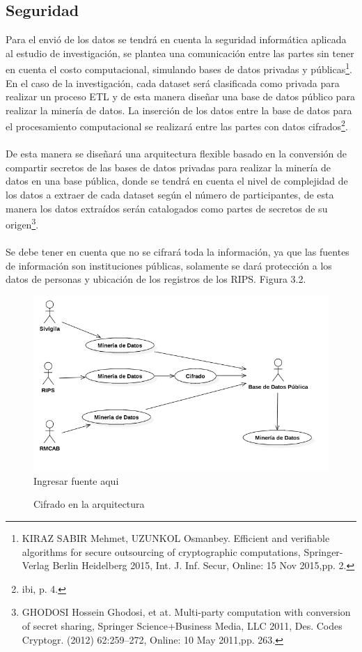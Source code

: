 \documentclass[a4paper,openright,12pt]{book}
\theoremstyle{definition}
\theoremstyle{remark}
\begin{document}
	\subsection{Seguridad}
Para el envió de los datos se tendrá en cuenta la seguridad informática aplicada al estudio de investigación, se plantea una comunicación entre las partes sin tener en cuenta el costo computacional, simulando bases de datos privadas y públicas\footnote{KIRAZ SABIR Mehmet, UZUNKOL Osmanbey. Efficient and verifiable algorithms for secure outsourcing of cryptographic computations, Springer-Verlag Berlin Heidelberg 2015, Int. J. Inf. Secur, Online: 15 Nov 2015,pp. 2.}. En el caso de la investigación, cada dataset será clasificada como privada para realizar un proceso ETL y de esta manera diseñar una base de datos público para realizar la minería de datos. La inserción de los datos entre la base de datos para el procesamiento computacional se realizará entre las partes con datos cifrados\footnote{ibi, p.  4.}.\\\\
De esta manera se diseñará una arquitectura flexible basado en la conversión de compartir secretos de las bases de datos privadas para realizar la minería de datos en una base pública, donde se tendrá en cuenta el nivel de complejidad de los datos a extraer de cada dataset según el número de participantes, de esta manera los datos extraídos serán catalogados como partes de secretos de su origen\footnote{GHODOSI Hossein Ghodosi, et at. Multi-party computation with conversion of secret sharing, Springer Science+Business Media, LLC 2011, Des. Codes Cryptogr. (2012) 62:259–272, Online: 10 May 2011,pp. 263.}.\\\\
Se debe tener en cuenta que no se cifrará toda la información, ya que las fuentes de información son instituciones públicas, solamente se dará protección a los datos de personas y ubicación de los registros de los RIPS. Figura 3.2.

\begin{figure}[htb]
\centering
\caption{Cifrado en la arquitectura} 
\includegraphics[scale=0.4]{Diagrama_Arq}
\label{fig:Cifrado}
\\Ingresar fuente aqui
\end{figure}
\end{document}

